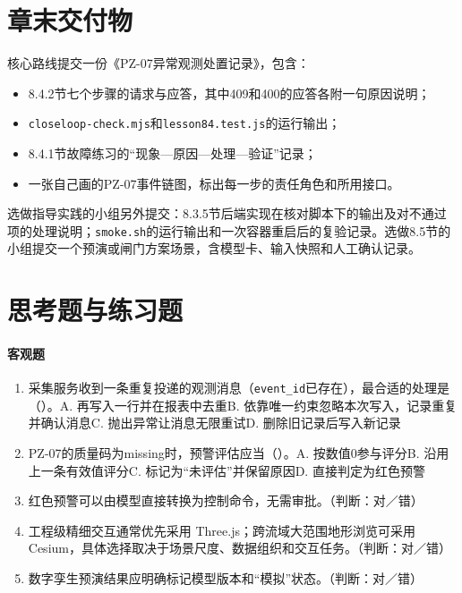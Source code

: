 \section*{章末交付物}

核心路线提交一份《PZ-07异常观测处置记录》，包含：

\begin{itemize}
\item 8.4.2节七个步骤的请求与应答，其中409和400的应答各附一句原因说明；
\item \texttt{closeloop-check.mjs}和\texttt{lesson84.test.js}的运行输出；
\item 8.4.1节故障练习的“现象—原因—处理—验证”记录；
\item 一张自己画的PZ-07事件链图，标出每一步的责任角色和所用接口。
\end{itemize}

选做指导实践的小组另外提交：8.3.5节后端实现在核对脚本下的输出及对不通过项的处理说明；\texttt{smoke.sh}的运行输出和一次容器重启后的复验记录。选做8.5节的小组提交一个预演或闸门方案场景，含模型卡、输入快照和人工确认记录。

\section*{思考题与练习题}

\paragraph{客观题}
\begin{enumerate}
\item 采集服务收到一条重复投递的观测消息（\texttt{event\_id}已存在），最合适的处理是（\quad）。A. 再写入一行并在报表中去重\quad B. 依靠唯一约束忽略本次写入，记录重复并确认消息\quad C. 抛出异常让消息无限重试\quad D. 删除旧记录后写入新记录
\item PZ-07的质量码为missing时，预警评估应当（\quad）。A. 按数值0参与评分\quad B. 沿用上一条有效值评分\quad C. 标记为“未评估”并保留原因\quad D. 直接判定为红色预警
\item 红色预警可以由模型直接转换为控制命令，无需审批。（判断：对／错）
\item 工程级精细交互通常优先采用 Three.js；跨流域大范围地形浏览可采用 Cesium，具体选择取决于场景尺度、数据组织和交互任务。（判断：对／错）
\item 数字孪生预演结果应明确标记模型版本和“模拟”状态。（判断：对／错）

\end{enumerate}

